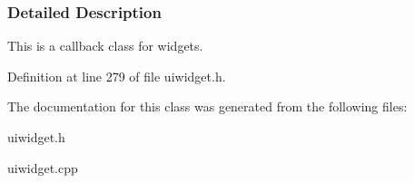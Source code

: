 \subsubsection{Detailed Description}
This is a callback class for widgets. 

Definition at line 279 of file uiwidget.h.



The documentation for this class was generated from the following files:\begin{DoxyCompactItemize}
\item 
uiwidget.h\item 
uiwidget.cpp\end{DoxyCompactItemize}
